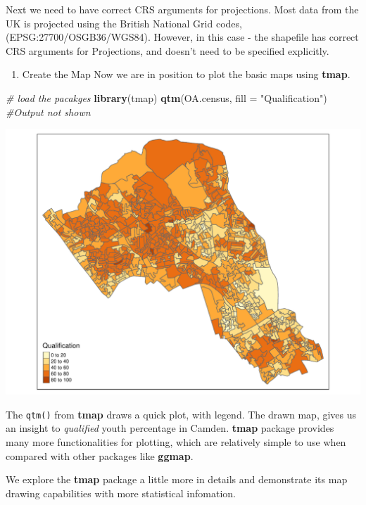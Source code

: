 \documentclass[]{article}
\newenvironment{Shaded}{}{}
\newcommand{\CommentTok}[1]{\textcolor[rgb]{0.38,0.63,0.69}{\textit{#1}}}
\newcommand{\DataTypeTok}[1]{\textcolor[rgb]{0.56,0.13,0.00}{#1}}
\newcommand{\KeywordTok}[1]{\textcolor[rgb]{0.00,0.44,0.13}{\textbf{#1}}}
\newcommand{\NormalTok}[1]{#1}
\newcommand{\StringTok}[1]{\textcolor[rgb]{0.25,0.44,0.63}{#1}}
\providecommand{\tightlist}{%
  \setlength{\itemsep}{0pt}\setlength{\parskip}{0pt}}
\begin{document}
Next we need to have correct CRS arguments for projections. Most data
from the UK is projected using the British National Grid codes,
(EPSG:27700/OSGB36/WGS84). However, in this case - the shapefile has
correct CRS arguments for Projections, and doesn't need to be specified
explicitly.

\begin{enumerate}
\def\labelenumi{\Roman{enumi}.}
\setcounter{enumi}{2}
\tightlist
\item
  Create the Map Now we are in position to plot the basic maps using
  \textbf{tmap}.
\end{enumerate}

\begin{Shaded}
\begin{Highlighting}[]
\CommentTok{# load the pacakges}
\KeywordTok{library}\NormalTok{(tmap)}
\KeywordTok{qtm}\NormalTok{(OA.census, }\DataTypeTok{fill =} \StringTok{"Qualification"}\NormalTok{) }\CommentTok{#Output not shown}
\end{Highlighting}
\end{Shaded}

\includegraphics{TutorialNotebook_files/figure-latex/unnamed-chunk-27-1.pdf}

The \texttt{qtm()} from \textbf{tmap} draws a quick plot, with legend.
The drawn map, gives us an insight to \emph{qualified} youth percentage
in Camden. \textbf{tmap} package provides many more functionalities for
plotting, which are relatively simple to use when compared with other
packages like \textbf{ggmap}.

We explore the \textbf{tmap} package a little more in details and
demonstrate its map drawing capabilities with more statistical
infomation.
\end{document}
